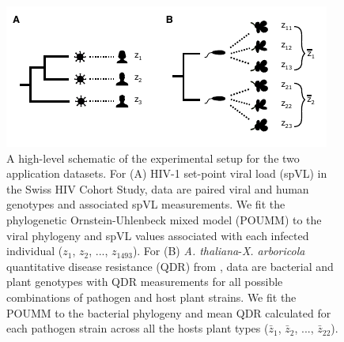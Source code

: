 \documentclass[11pt]{article}
\begin{document}
\begin{linenumbers}
\begin{figure}[H]
\begin{center}
    \includegraphics[width = \linewidth]{fig5_Stadler_MBE-21-1179.pdf}
	\caption{A high-level schematic of the experimental setup for the two application datasets. For (A) HIV-1 set-point viral load (spVL) in the Swiss HIV Cohort Study, data are paired viral and human genotypes and associated spVL measurements. We fit the phylogenetic Ornstein-Uhlenbeck mixed model (POUMM) to the viral phylogeny and spVL values associated with each infected individual ($z_1$, $z_2$, ..., $z_{1493}$). For (B) \emph{A. thaliana}-\emph{X. arboricola} quantitative disease resistance (QDR) from \cite{Wang2018Two-wayGenomes}, data are bacterial and plant genotypes with QDR measurements for all possible combinations of pathogen and host plant strains. We fit the POUMM to the bacterial phylogeny and mean QDR calculated for each pathogen strain across all the hosts plant types ($\bar{z}_1$, $\bar{z}_2$, ..., $\bar{z}_{22}$).}
	\label{fig:application-exp-setup}
	\end{center}
\end{figure}


\end{linenumbers}
\end{document}
